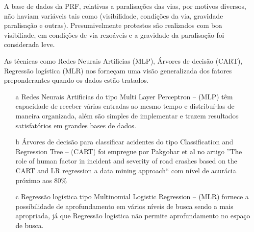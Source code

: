 A base de dados da PRF, relativas a paralisações das vias, por motivos diversos, não haviam variáveis tais como (visibilidade, condições da via, gravidade paralisação e outras).
Presumivelmente protestos são realizados com boa visibiliade, em condições de via rezoáveis e a gravidade da paralisação foi considerada leve.

As técnicas como Redes Neurais Artificias (MLP), Árvores de decisão (CART), Regressão logística (MLR) nos forneçam uma
visão generalizada dos fatores preponderantes quando os dados estão tratados.

\begin{itemize}
 \item[a] Redes Neurais Artificias do tipo Multi Layer Perceptron -- (MLP) têm capacidade de receber várias entradas ao mesmo tempo e distribuí-las de maneira organizada, além 
 são simples de implementar e trazem resultados satisfatórios em grandes bases de dados.
 
 \item[b] Árvores de decisão para classificar acidentes do tipo Classification and Regression Tree -- (CART) foi empregue por Pakgohar et al no artigo ''The role of human factor in incident and
severity of road crashes based on the CART and LR regression a data mining approach`` com nível de acurácia próximo aos 80\%

  \item[c] Regressão logística tipo Multinomial Logistic Regression -- (MLR) fornece a possíbilidade de aprofundamento em vários níveis de busca sendo a mais apropriada, já que Regressão logistica
não permite aprofundamento no espaço de busca.


\end{itemize}




